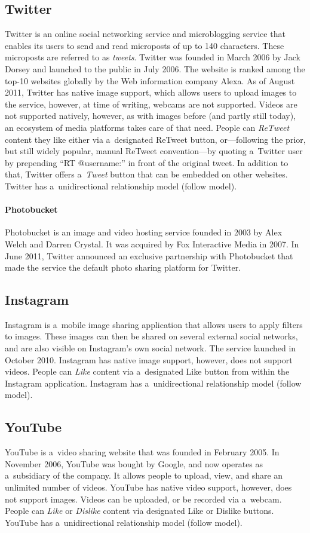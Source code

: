 \subsection{Twitter}
Twitter is an online social networking service and microblogging service
that enables its users to send and read microposts of up to 140 characters.
These microposts are referred to as \emph{tweets}.
Twitter was founded in March 2006 by Jack Dorsey and launched to the public in July 2006.
The website is ranked among the top-10 websites globally by the Web information company Alexa.
As of August 2011, Twitter has native image support,
which allows users to upload images to the service, however, at time of writing,
webcams are not supported.
Videos are not supported natively, however, as with images before (and partly still today),
an ecosystem of media platforms takes care of that need.
People can \emph{ReTweet} content they like either via a~designated ReTweet button,
or---following the prior, but still widely popular, manual ReTweet convention---by
quoting a~Twitter user by prepending ``RT @username:'' in front of the original tweet.
In addition to that, Twitter offers a~\emph{Tweet} button that can be embedded on other websites.
Twitter has a~unidirectional relationship model (follow model).

\paragraph{Photobucket}
Photobucket is an image and video hosting service
founded in 2003 by Alex Welch and Darren Crystal.
It was acquired by Fox Interactive Media in 2007.
In June 2011, Twitter announced an exclusive partnership with Photobucket
that made the service the default photo sharing platform for Twitter.

\subsection{Instagram}
Instagram is a~mobile image sharing application that allows users to apply filters to images.
These images can then be shared on several external social networks,
and are also visible on Instagram's own social network.
The service launched in October 2010.
Instagram has native image support, however, does not support videos.
People can \emph{Like} content via a~designated Like button
from within the Instagram application.
Instagram has a~unidirectional relationship model (follow model).

\subsection{YouTube}
YouTube is a~video sharing website that was founded in February 2005.
In November 2006, YouTube was bought by Google,
and now operates as a~subsidiary of the company.
It allows people to upload, view, and share an unlimited number of videos.
YouTube has native video support, however, does not support images.
Videos can be uploaded, or be recorded via a~webcam.
People can \emph{Like} or \emph{Dislike} content via designated Like or Dislike buttons.
YouTube has a~unidirectional relationship model (follow model).

